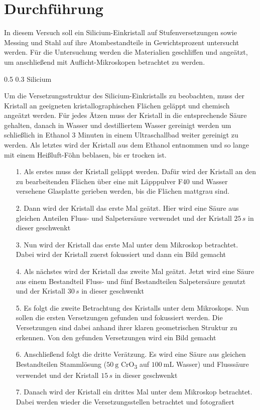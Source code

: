 \documentclass[german, %
parskip=full, %
bibliography=totoc, %
]{scrartcl}
\makeatletter
\renewcommand\subsection{\@startsection 
   {subsection}{2}{0mm}%
   {0.5\baselineskip}%
   {0.3\baselineskip}%
   {\bfseries\sffamily\large}%
   }
\makeatother
\begin{document}
\section{Durchführung}

In diesem Versuch soll ein Silicium-Einkristall auf Stufenversetzungen sowie Messing und Stahl auf ihre Atombestandteile in Gewichtsprozent untersucht werden. Für die Untersuchung werden die Materialien geschliffen und angeätzt, um anschließend mit Auflicht-Mikroskopen betrachtet zu werden.

\subsection{Silicium}

Um die Versetzungsstruktur des Silicium-Einkristalls zu beobachten, muss der Kristall an geeigneten kristallographischen Flächen geläppt und chemisch angeätzt werden. Für jedes Ätzen muss der Kristall in die entsprechende Säure gehalten, danach in Wasser und destilliertem Wasser gereinigt werden um schließlich in Ethanol 3 Minuten in einem Ultraschallbad weiter gereinigt zu werden. Als letztes wird der Kristall aus dem Ethanol entnommen und so lange mit einem Heißluft-Föhn beblasen, bis er trocken ist. 
\begin{itemize}
\item[1.] Als erstes muss der Kristall geläppt werden. Dafür wird der Kristall an den zu bearbeitenden Flächen über eine mit Läpppulver F40 und Wasser versehene Glasplatte gerieben werden, bis die Flächen mattgrau sind.
\item[2.] Dann wird der Kristall das erste Mal geätzt. Hier wird eine Säure aus gleichen Anteilen Fluss- und Salpetersäure verwendet und der Kristall $25\,s$ in dieser geschwenkt
\item[3.] Nun wird der Kristall das erste Mal unter dem Mikroskop betrachtet. Dabei wird der Kristall zuerst fokussiert und dann ein Bild gemacht
\item[4.] Als nächstes wird der Kristall das zweite Mal geätzt. Jetzt wird eine Säure aus einem Bestandteil Fluss- und fünf Bestandteilen Salpetersäure genutzt und der Kristall $30\,s$ in dieser geschwenkt
\item[5.] Es folgt die zweite Betrachtung des Kristalls unter dem Mikroskops. Nun sollen die ersten Versetzungen gefunden und fokussiert werden. Die Versetzungen sind dabei anhand ihrer klaren geometrischen Struktur zu erkennen. Von den gefunden Versetzungen wird ein Bild gemacht
\item[6.] Anschließend folgt die dritte Verätzung. Es wird eine Säure aus gleichen Bestandteilen Stammlösung (\(\SI{50}{\gram}\) CrO\textsubscript{3} auf \(\SI{100}{\milli\liter}\) Wasser) und Flusssäure verwendet und der Kristall $15\,s$ in dieser geschwenkt
\item[7.] Danach wird der Kristall ein drittes Mal unter dem Mikroskop betrachtet. Dabei werden wieder die Versetzungsstellen betrachtet und fotografiert
\end{itemize}
\end{document}
